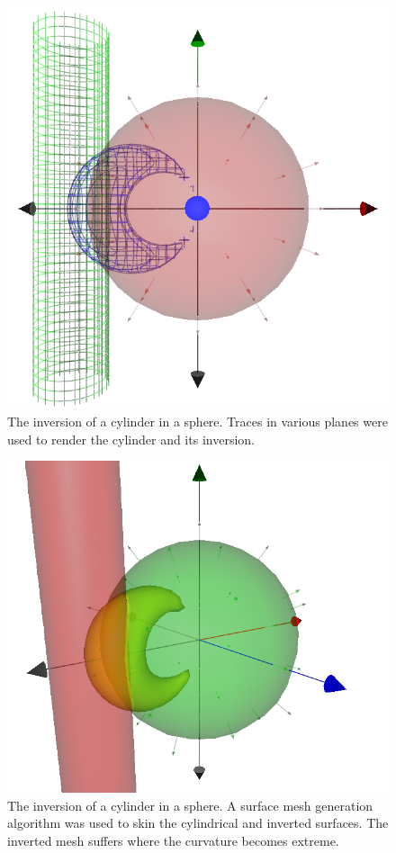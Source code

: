 \documentclass{birkjour}
\theoremstyle{definition}
\theoremstyle{remark}
\numberwithin{equation}{section}
\begin{document}
\begin{figure}
\includegraphics[scale=0.3]{InvertCylinderInSphereWire}
\caption{The inversion of a cylinder in a sphere.  Traces in various planes were
used to render the cylinder and its inversion.}
\label{fig_invert_cylinder_in_sphere_wire}
\end{figure}
\begin{figure}
\includegraphics[scale=0.3]{InvertCylinderInSphereSolid}
\caption{The inversion of a cylinder in a sphere.  A surface mesh generation
algorithm was used to skin the cylindrical and inverted surfaces.  The inverted
mesh suffers where the curvature becomes extreme.}
\label{fig_invert_cylinder_in_sphere_solid}
\end{figure}
\end{document}
